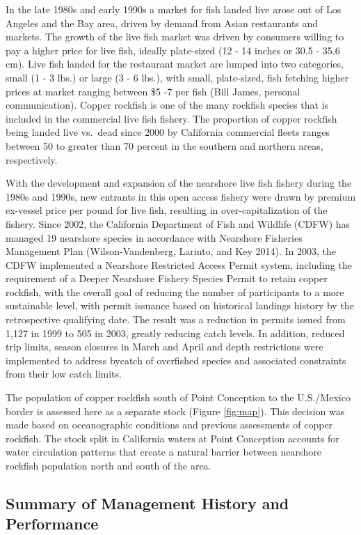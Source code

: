 \documentclass[11pt,
  english,
  letterpaper,
]{article}
\begin{document}
In the late 1980s and early 1990s a market for fish landed live arose out of Los Angeles and the Bay area, driven by demand from Asian restaurants and markets. The growth of the live fish market was driven by consumers willing to pay a higher price for live fish, ideally plate-sized (12 - 14 inches or 30.5 - 35.6 cm). Live fish landed for the restaurant market are lumped into two categories, small (1 - 3 lbs.) or large (3 - 6 lbs.), with small, plate-sized, fish fetching higher prices at market ranging between \$5 -7 per fish (Bill James, personal communication). Copper rockfish is one of the many rockfish species that is included in the commercial live fish fishery. The proportion of copper rockfish being landed live vs.~dead since 2000 by California commercial fleets ranges between 50 to greater than 70 percent in the southern and northern areas, respectively.

With the development and expansion of the nearshore live fish fishery during the 1980s and 1990s, new entrants in this open access fishery were drawn by premium ex-vessel price per pound for live fish, resulting in over-capitalization of the fishery. Since 2002, the California Department of Fish and Wildlife (CDFW) has managed 19 nearshore species in accordance with Nearshore Fisheries Management Plan (Wilson-Vandenberg, Larinto, and Key 2014). In 2003, the CDFW implemented a Nearshore Restricted Access Permit system, including the requirement of a Deeper Nearshore Fishery Species Permit to retain copper rockfish, with the overall goal of reducing the number of participants to a more sustainable level, with permit issuance based on historical landings history by the retrospective qualifying date. The result was a reduction in permits issued from 1,127 in 1999 to 505 in 2003, greatly reducing catch levels. In addition, reduced trip limits, season closures in March and April and depth restrictions were implemented to address bycatch of overfished species and associated constraints from their low catch limits.

The population of copper rockfish south of Point Conception to the U.S./Mexico border is assessed here as a separate stock (Figure \ref{fig:map}). This decision was made based on oceanographic conditions and previous assessments of copper rockfish. The stock split in California waters at Point Conception accounts for water circulation patterns that create a natural barrier between nearshore rockfish population north and south of the area.

\hypertarget{summary-of-management-history-and-performance}{%
\subsection{Summary of Management History and Performance}\label{summary-of-management-history-and-performance}}
\end{document}
